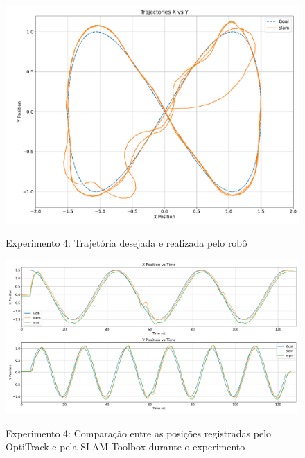 \begin{figure}[htb]
    \centering
    \caption{Experimento 4: Trajetória desejada e realizada pelo robô}
    \includegraphics[width=0.8\linewidth]{img/Resultados/Exp4_SLAM_Control_LEMNISCATA/Trajetoria_SLAM.pdf}
    \source
    \label{fig:Exp4_Trajetoria}
\end{figure}


\begin{figure}[htb]
    \centering
    \caption{Experimento 4: Comparação entre as posições registradas pelo OptiTrack e pela SLAM Toolbox durante o experimento}
    \includegraphics[width=\linewidth]{img/Resultados/Exp4_SLAM_Control_LEMNISCATA/Position_v_time_Comparison.pdf}
    \label{fig:Exp4_Posicao_Tempo}
    \source
\end{figure}